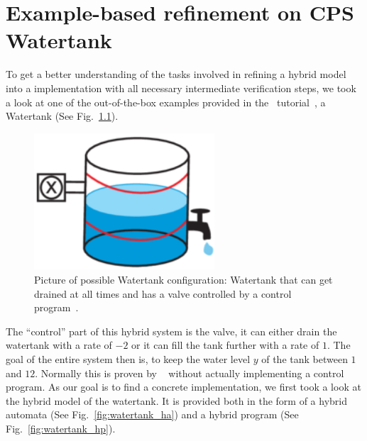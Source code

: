 



\chapter{Example-based refinement on CPS Watertank}
\label{ch:Watertank}

To get a better understanding of the tasks involved in refining a hybrid model into a implementation with all necessary intermediate verification steps, we took a look at one of the out-of-the-box examples provided in the \keym~tutorial~\cite{keYmaera}, a Watertank (See Fig.~\ref{fig:watertank}).

\begin{figure}
	\setcounter{figure}{0}
	\centering
	\includegraphics[width=0.6\textwidth]{images/watertank}
	\caption{Picture of possible Watertank configuration: Watertank that can get drained at all times and has a valve controlled by a control program~\cite{keymaeraGuide}.}
	\label{fig:watertank}
\end{figure}

The ``control'' part of this hybrid system is the valve, it can either drain the watertank with a rate of \(-2\) or it can fill the tank further with a rate of \(1\). The goal of the entire system then is, to keep the water level \(y\) of the tank between \(1\) and \(12\). Normally this is proven by \keym~ without actually implementing a control program. As our goal is to find a concrete implementation,  we first took a look at the hybrid model of the watertank. It is provided both in the form of a hybrid automata (See Fig.~\ref{fig:watertank_ha}) and a hybrid program (See Fig.~\ref{fig:watertank_hp}).

